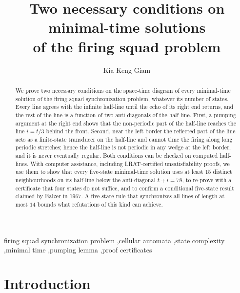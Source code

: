\documentclass[3p]{elsarticle}
\theoremstyle{remark}
\begin{document}
\begin{frontmatter}

\title{Two necessary conditions on minimal-time solutions\\
of the firing squad problem}

\author[tjc]{Kia Keng Giam}


\begin{abstract}
We prove two necessary conditions on the space-time diagram of every
minimal-time solution of the firing squad synchronization problem, whatever
its number of states. Every line agrees with the infinite half-line until the
echo of its right end returns, and the rest of the line is a function of two
anti-diagonals of the half-line. First, a pumping argument at the right end
shows that the non-periodic part of the half-line reaches the line $i=t/3$
behind the front. Second, near the left border the reflected part of the line
acts as a finite-state transducer on the half-line and cannot time the firing
along long periodic stretches; hence the half-line is not periodic in any wedge
at the left border, and it is never eventually regular. Both conditions can be
checked on computed half-lines. With computer assistance, including
LRAT-certified unsatisfiability proofs, we use them to show that every
five-state minimal-time solution uses at least $15$ distinct neighbourhoods on
its half-line below the anti-diagonal $t+i=78$, to re-prove with a certificate
that four states do not suffice, and to confirm a conditional five-state result
claimed by Balzer in 1967. A five-state rule that synchronizes all lines of
length at most $14$ bounds what refutations of this kind can achieve.
\end{abstract}

\begin{keyword}
firing squad synchronization problem \sep cellular automata \sep state
complexity \sep minimal time \sep pumping lemma \sep proof certificates
\end{keyword}

\end{frontmatter}

\section{Introduction}\label{sec:intro}
\end{document}
